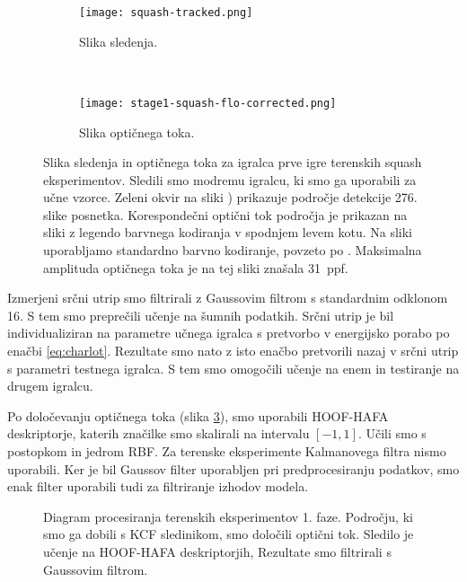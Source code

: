 \begin{figure}[!htb]
	\centering
	\begin{subfigure}[t]{0.45\columnwidth}
		\centering
		\texttt{[image: squash-tracked.png]}
		\caption{Slika sledenja.}
	    \label{fig:sledenje-squash}
	\end{subfigure}
	~
	\begin{subfigure}[t]{0.45\columnwidth}
		\centering
		\texttt{[image: stage1-squash-flo-corrected.png]}
		\caption{Slika optičnega toka.}
		\label{fig:of-squash}
	\end{subfigure}
	\caption[Slika sledenja in optičnega toka za igralca prve igre terenskih squash eksperimentov]{Slika sledenja in optičnega toka za igralca prve igre terenskih squash eksperimentov. Sledili smo modremu igralcu, ki smo ga uporabili za učne vzorce. Zeleni okvir na sliki ) prikazuje področje detekcije 276. slike posnetka. Korespondečni optični tok področja je prikazan na sliki  z legendo barvnega kodiranja v spodnjem levem kotu. Na sliki uporabljamo standardno barvno kodiranje, povzeto po \cite{baker2011database}. Maksimalna amplituda optičnega toka je na tej sliki znašala \SI{31}{ppf}. }
	\label{fig:squash}
\end{figure}

Izmerjeni srčni utrip smo filtrirali z Gaussovim filtrom s standardnim odklonom \num{16}. S tem smo preprečili učenje na šumnih podatkih. Srčni utrip je bil individualiziran na parametre učnega igralca s pretvorbo v energijsko porabo po enačbi \eqref{eq:charlot}. Rezultate smo nato z isto enačbo pretvorili nazaj v srčni utrip s parametri testnega igralca. S tem smo omogočili učenje na enem in testiranje na drugem igralcu. 

Po določevanju optičnega toka (slika \ref{fig:squash}), smo uporabili HOOF-HAFA deskriptorje, katerih značilke smo skalirali na intervalu $[-1,1]$. Učili smo s postopkom \esvr in jedrom RBF. Za terenske eksperimente Kalmanovega filtra nismo uporabili. Ker je bil Gaussov filter uporabljen pri predprocesiranju podatkov, smo enak filter uporabili tudi za filtriranje izhodov modela.

\begin{figure}[!htb]
	\centering
	
	\caption[Diagram procesiranja terenskih eksperimentov 1. faze]{Diagram procesiranja terenskih eksperimentov 1. faze. Področju, ki smo ga dobili s KCF sledinikom, smo določili optični tok. Sledilo je učenje na HOOF-HAFA deskriptorjih, Rezultate smo filtrirali s Gaussovim filtrom.}
	\label{fig:diagram-procesiranja-field-stag1}
\end{figure}

















